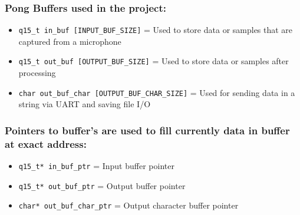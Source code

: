 \documentclass[11pt]{article}
\begin{document}
\subsubsection*{Pong Buffers used in the project:}
\label{sec:org1a4e705}

\begin{itemize}
\item \texttt{q15\_t in\_buf [INPUT\_BUF\_SIZE]} = Used to store data or samples that are captured from a microphone
\item \texttt{q15\_t out\_buf [OUTPUT\_BUF\_SIZE]} = Used to store data or samples after processing
\item \texttt{char out\_buf\_char [OUTPUT\_BUF\_CHAR\_SIZE]} = Used for sending data in a string via UART and saving file I/O
\end{itemize}

\subsubsection*{Pointers to buffer's are used to fill currently data in buffer at exact address:}
\label{sec:org8016c2b}

\begin{itemize}
\item \texttt{q15\_t* in\_buf\_ptr} = Input buffer pointer
\item \texttt{q15\_t* out\_buf\_ptr} = Output buffer pointer
\item \texttt{char* out\_buf\_char\_ptr} = Output character buffer pointer
\end{itemize}
\end{document}

